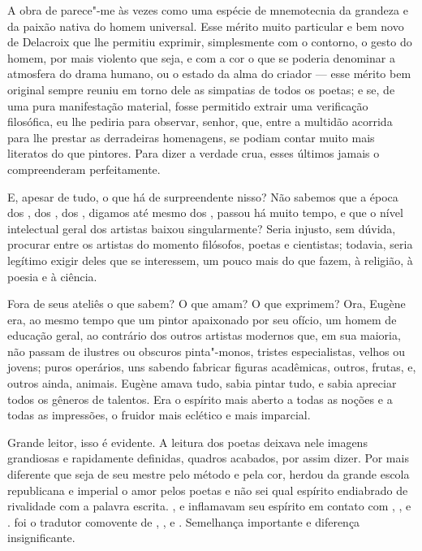 A obra de  parece"-me às vezes como uma espécie de mnemotecnia
da grandeza e da paixão nativa do homem universal. Esse mérito muito
particular e bem novo de Delacroix que lhe permitiu exprimir,
simplesmente com o contorno, o gesto do homem, por mais violento que
seja, e com a cor o que se poderia denominar a atmosfera do drama
humano, ou o estado da alma do criador --- esse mérito bem original
sempre reuniu em torno dele as simpatias de todos os poetas; e se, de
uma pura manifestação material, fosse permitido extrair uma verificação
filosófica, eu lhe pediria para observar, senhor, que, entre a multidão
acorrida para lhe prestar as derradeiras homenagens, se podiam contar
muito mais literatos do que pintores. Para dizer a verdade crua, esses
últimos jamais o compreenderam perfeitamente.

\sectionitem

E, apesar de tudo, o que há de surpreendente nisso? Não sabemos que a
época dos , dos , dos , digamos até
mesmo dos , passou há muito tempo, e que o nível intelectual
geral dos artistas baixou singularmente? Seria injusto, sem dúvida,
procurar entre os artistas do momento filósofos, poetas e cientistas;
todavia, seria legítimo exigir deles que se interessem, um pouco mais
do que fazem, à religião, à poesia e à ciência.

Fora de seus ateliês o que sabem? O que amam? O que exprimem? Ora,
Eugène  era, ao mesmo tempo que um pintor apaixonado por seu
ofício, um homem de educação geral, ao contrário dos outros artistas
modernos que, em sua maioria, não passam de ilustres ou obscuros
pinta"-monos, tristes especialistas, velhos ou jovens; puros operários,
uns sabendo fabricar figuras acadêmicas, outros, frutas, e, outros
ainda, animais. Eugène  amava tudo, sabia pintar tudo, e sabia
apreciar todos os gêneros de talentos. Era o espírito mais aberto a
todas as noções e a todas as impressões, o fruidor mais eclético e mais
imparcial.

Grande leitor, isso é evidente. A leitura dos poetas deixava nele
imagens grandiosas e rapidamente definidas, quadros acabados, por assim
dizer. Por mais diferente que seja de seu mestre  pelo método e
pela cor, herdou da grande escola republicana e imperial o amor pelos
poetas e não sei qual espírito endiabrado de rivalidade com a palavra
escrita. ,  e  inflamavam seu espírito em contato com
, ,  e .  foi o tradutor comovente
de , ,  e . Semelhança importante e
diferença insignificante.

